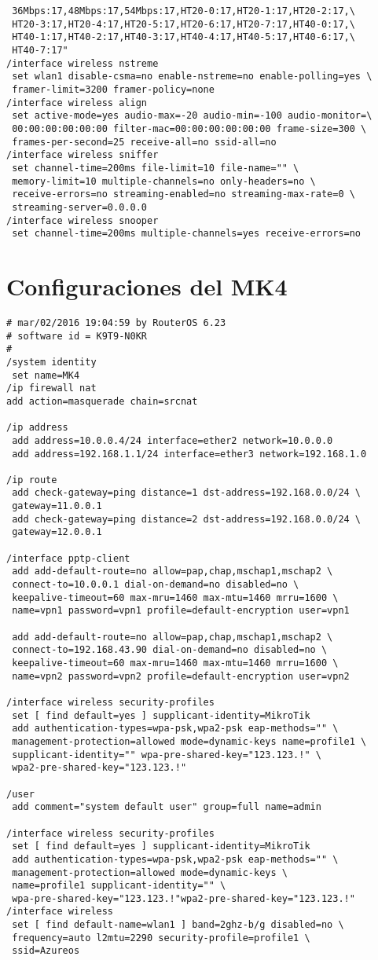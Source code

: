 \begin{verbatim}
 36Mbps:17,48Mbps:17,54Mbps:17,HT20-0:17,HT20-1:17,HT20-2:17,\
 HT20-3:17,HT20-4:17,HT20-5:17,HT20-6:17,HT20-7:17,HT40-0:17,\
 HT40-1:17,HT40-2:17,HT40-3:17,HT40-4:17,HT40-5:17,HT40-6:17,\
 HT40-7:17"
/interface wireless nstreme
 set wlan1 disable-csma=no enable-nstreme=no enable-polling=yes \
 framer-limit=3200 framer-policy=none
/interface wireless align
 set active-mode=yes audio-max=-20 audio-min=-100 audio-monitor=\
 00:00:00:00:00:00 filter-mac=00:00:00:00:00:00 frame-size=300 \
 frames-per-second=25 receive-all=no ssid-all=no
/interface wireless sniffer
 set channel-time=200ms file-limit=10 file-name="" \
 memory-limit=10 multiple-channels=no only-headers=no \
 receive-errors=no streaming-enabled=no streaming-max-rate=0 \
 streaming-server=0.0.0.0
/interface wireless snooper
 set channel-time=200ms multiple-channels=yes receive-errors=no
\end{verbatim}
\section{Configuraciones del MK4}
\begin{verbatim}
# mar/02/2016 19:04:59 by RouterOS 6.23
# software id = K9T9-N0KR
#
/system identity
 set name=MK4
/ip firewall nat
add action=masquerade chain=srcnat

/ip address
 add address=10.0.0.4/24 interface=ether2 network=10.0.0.0
 add address=192.168.1.1/24 interface=ether3 network=192.168.1.0

/ip route
 add check-gateway=ping distance=1 dst-address=192.168.0.0/24 \
 gateway=11.0.0.1
 add check-gateway=ping distance=2 dst-address=192.168.0.0/24 \
 gateway=12.0.0.1

/interface pptp-client
 add add-default-route=no allow=pap,chap,mschap1,mschap2 \
 connect-to=10.0.0.1 dial-on-demand=no disabled=no \
 keepalive-timeout=60 max-mru=1460 max-mtu=1460 mrru=1600 \
 name=vpn1 password=vpn1 profile=default-encryption user=vpn1

 add add-default-route=no allow=pap,chap,mschap1,mschap2 \
 connect-to=192.168.43.90 dial-on-demand=no disabled=no \
 keepalive-timeout=60 max-mru=1460 max-mtu=1460 mrru=1600 \
 name=vpn2 password=vpn2 profile=default-encryption user=vpn2

/interface wireless security-profiles
 set [ find default=yes ] supplicant-identity=MikroTik
 add authentication-types=wpa-psk,wpa2-psk eap-methods="" \
 management-protection=allowed mode=dynamic-keys name=profile1 \
 supplicant-identity="" wpa-pre-shared-key="123.123.!" \
 wpa2-pre-shared-key="123.123.!"

/user
 add comment="system default user" group=full name=admin

/interface wireless security-profiles
 set [ find default=yes ] supplicant-identity=MikroTik
 add authentication-types=wpa-psk,wpa2-psk eap-methods="" \
 management-protection=allowed mode=dynamic-keys \
 name=profile1 supplicant-identity="" \
 wpa-pre-shared-key="123.123.!"wpa2-pre-shared-key="123.123.!"
/interface wireless
 set [ find default-name=wlan1 ] band=2ghz-b/g disabled=no \
 frequency=auto l2mtu=2290 security-profile=profile1 \
 ssid=Azureos

\end{verbatim}